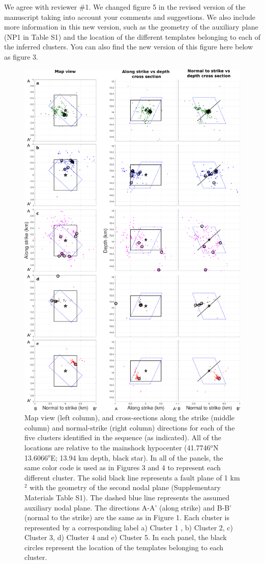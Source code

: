 \documentclass[10pt]{extarticle}
\begin{document}
\begin{Answer}
We agree with reviewer \#1. We changed figure 5 in the revised version of the manuscript taking into account your comments and suggestions. We also include more information in this new version, such as the geometry of the auxiliary plane (NP1 in Table S1) and the location of the different templates belonging to each of the inferred clusters. You can also find the new version of this figure here below as figure 3.
\begin{figure}[!h]
\begin{center}
 \includegraphics[width=0.75\linewidth]{map_clusters_templates}
\end{center}
\caption{Map view (left column), and cross-sections along the strike (middle column) and normal-strike (right column) directions for each of the five clusters identified in the sequence (as indicated). All of the locations are relative to the mainshock hypocenter (41.7746$^o$N 13.6066$^o$E; 13.94 km depth, black star). In all of the panels, the same color code is used as in Figures 3 and 4 to represent each different cluster. The solid black line represents a fault plane of 1 km$^2$ with the geometry of the second nodal plane (Supplementary Materials Table S1). The dashed blue line represents the assumed auxiliary nodal plane. The directions A-A' (along strike) and B-B' (normal to the strike) are the same as in Figure 1. Each cluster is represented by a corresponding label a) Cluster 1 , b) Cluster 2, c) Cluster 3, d) Cluster 4 and e) Cluster 5. In each panel, the black circles represent the location of the templates belonging to each cluster.}
\label{fig:map_improved}
\end{figure}
 \WorkInProgressRevTask
\end{Answer}
%
%
\end{document}
